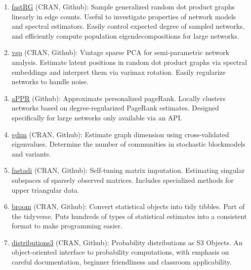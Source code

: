 \documentclass[11pt]{article}
\newcommand{\underlinedlink}[2]{\href{#1}{\ul{#2}}}
\begin{document}
\begin{enumerate}
    \item \underlinedlink{https://CRAN.R-project.org/package=fastRG}{fastRG} (CRAN, Github): Sample generalized random dot product graphs linearly in edge counts. Useful to investigate properties of network models and spectral estimators. Easily control expected degree of sampled networks, and efficiently compute population eigendecompositions for large networks.

    \item \underlinedlink{https://CRAN.R-project.org/package=vsp}{vsp} (CRAN, Github): Vintage sparse PCA for semi-parametric network analysis. Estimate latent positions in random dot product graphs via spectral embeddings and interpret them via varimax rotation. Easily regularize networks to handle noise.

    \item \underlinedlink{https://rohelab.github.io/aPPR/}{aPPR} (Github): Approximate personalized pageRank. Locally clusters networks based on degree-regularized PageRank estimates. Designed specifically for large networks only available via an API.

    \item \underlinedlink{https://CRAN.R-project.org/package=gdim}{gdim} (CRAN, Github): Estimate graph dimension using cross-validated eigenvalues. Determine the number of communities in stochastic blockmodels and variants.

    \item \underlinedlink{https://CRAN.R-project.org/package=fastadi}{fastadi} (CRAN, Github): Self-tuning matrix imputation. Estimating singular subspaces of sparsely observed matrices. Includes specialized methods for upper triangular data.

    \item \underlinedlink{https://CRAN.R-project.org/package=broom}{broom} (CRAN, Github): Convert statistical objects into tidy tibbles. Part of the tidyverse. Puts hundreds of types of statistical estimates into a consistent format to make programming easier.

    \item \underlinedlink{https://CRAN.R-project.org/package=distributions3}{distributions3} (CRAN, Github): Probability distributions as S3 Objects. An object-oriented interface to probability computations, with emphasis on careful documentation, beginner friendliness and classroom applicability.
\end{enumerate}
\end{document}
